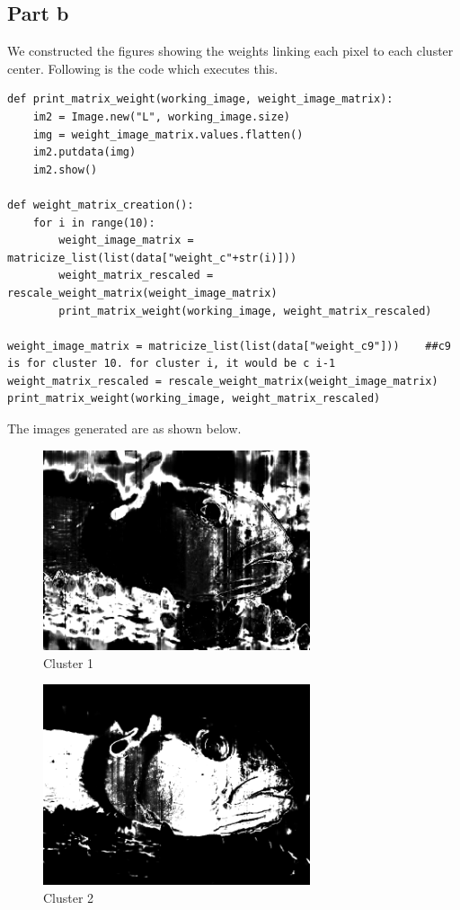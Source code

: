 \documentclass{article}      %
\begin{document}
\subsection{Part b}

We constructed the figures showing the weights linking each pixel to each cluster center. Following is the code which executes this.

\begin{lstlisting}
def print_matrix_weight(working_image, weight_image_matrix):
    im2 = Image.new("L", working_image.size)
    img = weight_image_matrix.values.flatten()
    im2.putdata(img)
    im2.show()

def weight_matrix_creation():
    for i in range(10):
        weight_image_matrix = matricize_list(list(data["weight_c"+str(i)]))
        weight_matrix_rescaled = rescale_weight_matrix(weight_image_matrix)
        print_matrix_weight(working_image, weight_matrix_rescaled)

weight_image_matrix = matricize_list(list(data["weight_c9"]))    ##c9 is for cluster 10. for cluster i, it would be c i-1
weight_matrix_rescaled = rescale_weight_matrix(weight_image_matrix)
print_matrix_weight(working_image, weight_matrix_rescaled)
\end{lstlisting}

The images generated are as shown below.

\begin{figure}[H]
\centering
\includegraphics[width=0.7\textwidth]{partb_wts_cluster0}
\caption{Cluster 1}
\end{figure}

\begin{figure}[H]
\centering
\includegraphics[width=0.7\textwidth]{partb_wts_cluster1}
\caption{Cluster 2}
\end{figure}
\end{document}
